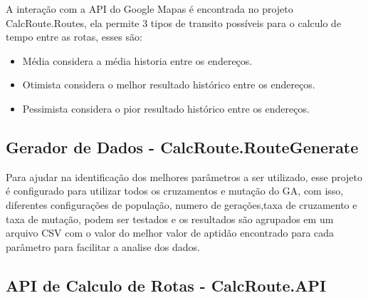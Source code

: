 A interação com a API do Google Mapas é encontrada no projeto CalcRoute.Routes, ela permite 3 tipos de transito possíveis para o calculo de tempo entre as rotas, esses são:
\begin{itemize}
	\item Média considera a média historia entre os endereços.
	\item Otimista considera o melhor resultado histórico entre os endereços.
	\item Pessimista considera o pior resultado histórico entre os endereços.
\end{itemize}

\subsection{Gerador de Dados - CalcRoute.RouteGenerate}

Para ajudar na identificação dos melhores parâmetros a ser utilizado, esse projeto é configurado para utilizar todos os cruzamentos e mutação do GA, com isso, diferentes configurações de população, numero de gerações,taxa de cruzamento e taxa de mutação, podem ser testados e os resultados são agrupados em um arquivo CSV com o valor do melhor valor de aptidão encontrado para cada parâmetro para facilitar a analise dos dados.

\begin{center}
	\label{fig:DataGenerate}
\end{center}

\subsection{API de Calculo de Rotas - CalcRoute.API}

